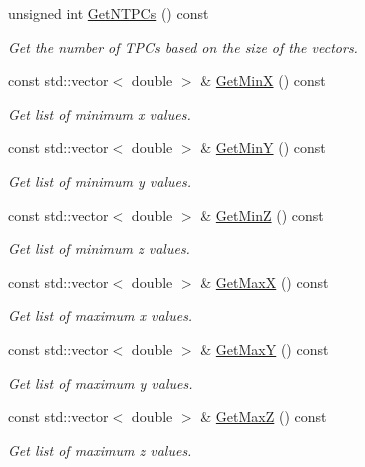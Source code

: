 \begin{DoxyCompactItemize}
unsigned int \hyperlink{classcalib_1_1Geometry_a549443a1465d733b963af16b523d9582}{Get\-N\-T\-P\-Cs} () const 
\begin{DoxyCompactList}\small\item\em Get the number of T\-P\-Cs based on the size of the vectors. \end{DoxyCompactList}\item 
const std\-::vector$<$ double $>$ \& \hyperlink{classcalib_1_1Geometry_a6ba03d84d6ad4dad78d32aa18014ab13}{Get\-Min\-X} () const 
\begin{DoxyCompactList}\small\item\em Get list of minimum x values. \end{DoxyCompactList}\item 
const std\-::vector$<$ double $>$ \& \hyperlink{classcalib_1_1Geometry_ac2cbc474867079e863652c9001dac297}{Get\-Min\-Y} () const 
\begin{DoxyCompactList}\small\item\em Get list of minimum y values. \end{DoxyCompactList}\item 
const std\-::vector$<$ double $>$ \& \hyperlink{classcalib_1_1Geometry_a408ff02bdcc8ba992e64b75613a8633f}{Get\-Min\-Z} () const 
\begin{DoxyCompactList}\small\item\em Get list of minimum z values. \end{DoxyCompactList}\item 
const std\-::vector$<$ double $>$ \& \hyperlink{classcalib_1_1Geometry_a82cd39f3f4a8d97b5e2ab94183e45745}{Get\-Max\-X} () const 
\begin{DoxyCompactList}\small\item\em Get list of maximum x values. \end{DoxyCompactList}\item 
const std\-::vector$<$ double $>$ \& \hyperlink{classcalib_1_1Geometry_af2900f1046eded6ce14bd64d78ca8de5}{Get\-Max\-Y} () const 
\begin{DoxyCompactList}\small\item\em Get list of maximum y values. \end{DoxyCompactList}\item 
const std\-::vector$<$ double $>$ \& \hyperlink{classcalib_1_1Geometry_ad152d46e9241b2318e209b8e3b001d28}{Get\-Max\-Z} () const 
\begin{DoxyCompactList}\small\item\em Get list of maximum z values. \end{DoxyCompactList}\end{DoxyCompactItemize}
